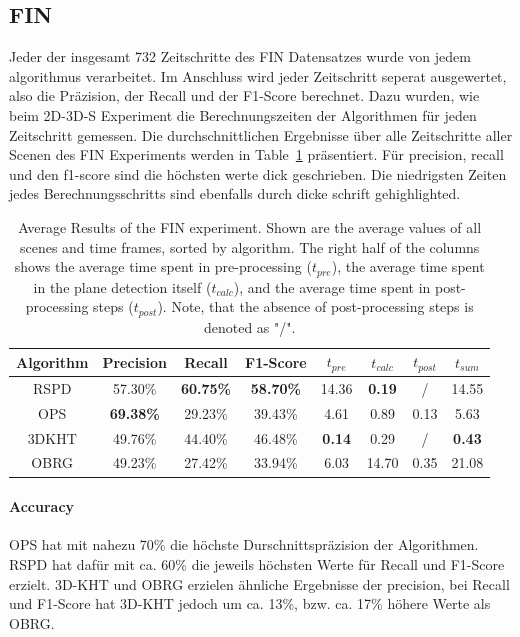 \documentclass[main.tex]{subfiles}
\begin{document}
\subsection{FIN}
Jeder der insgesamt 732 Zeitschritte des FIN Datensatzes wurde von jedem algorithmus verarbeitet. Im Anschluss wird
jeder Zeitschritt seperat ausgewertet, also die Präzision, der Recall und der F1-Score berechnet. Dazu
wurden, wie beim 2D-3D-S Experiment die Berechnungszeiten der Algorithmen für jeden Zeitschritt gemessen.
Die durchschnittlichen Ergebnisse über alle Zeitschritte aller Scenen des FIN Experiments werden
in Table~\ref{tab:res-fin-total} präsentiert. Für precision, recall und den f1-score sind die höchsten werte dick geschrieben.
Die niedrigsten Zeiten jedes Berechnungsschritts sind ebenfalls durch dicke schrift gehighlighted.


\begin{table}[H]
    \centering
    \begin{tabular}{c|cccccc|c}
        Algorithm & Precision        & Recall           & F1-Score         & $t_{pre}$     & $t_{calc}$    & $t_{post}$ & $t_{sum}$     \\ \hline
        RSPD      & 57.30\%          & \textbf{60.75\%} & \textbf{58.70\%} & 14.36         & \textbf{0.19} & /          & 14.55         \\
        OPS       & \textbf{69.38\%} & 29.23\%          & 39.43\%          & 4.61          & 0.89          & 0.13       & 5.63          \\
        3DKHT     & 49.76\%          & 44.40\%          & 46.48\%          & \textbf{0.14} & 0.29          & /          & \textbf{0.43} \\
        OBRG      & 49.23\%          & 27.42\%          & 33.94\%          & 6.03          & 14.70         & 0.35       & 21.08
    \end{tabular}
    \caption[Average FIN Results]{Average Results of the FIN experiment. Shown are the average values of all scenes and time frames, sorted by
        algorithm. The right half of the columns shows the average time spent in pre-processing ($t_{pre}$), the average time spent in the plane
        detection itself ($t_{calc}$), and the average time spent in post-processing steps ($t_{post}$).
        Note, that the absence of post-processing steps is denoted as "/".}
    \label{tab:res-fin-total}
\end{table}

\paragraph{Accuracy}
OPS hat mit nahezu 70\% die höchste Durschnittspräzision der Algorithmen. RSPD hat dafür mit ca. 60\% die jeweils höchsten
Werte für Recall und F1-Score erzielt. 3D-KHT und OBRG erzielen ähnliche Ergebnisse der precision, bei Recall und
F1-Score hat 3D-KHT jedoch um ca. 13\%, bzw. ca. 17\% höhere Werte als OBRG.
\end{document}
